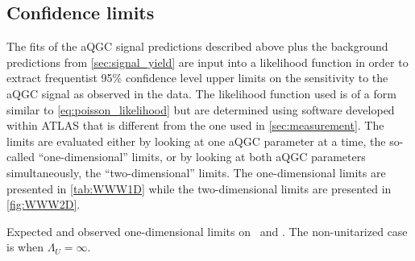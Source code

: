 \subsection{Confidence limits}

The fits of the aQGC signal predictions described above plus the background predictions
from \sec\ref{sec:signal_yield} are input into a likelihood function
in order to extract frequentist 95\% confidence level upper limits on the 
sensitivity to the aQGC signal as observed in the data.
The likelihood function used is of a form similar to \eqn\eqref{eq:poisson_likelihood}
but are determined using software developed within ATLAS \cite{tgclim} that is different
from the one used in \sec\ref{sec:measurement}.
The limits are evaluated either by looking at one aQGC 
parameter at a time, the so-called ``one-dimensional''
limits, or by looking at both aQGC parameters simultaneously, the 
``two-dimensional'' limits. The one-dimensional limits
are presented in \tab\ref{tab:WWW1D}
while the two-dimensional limits are presented in 
\fig\ref{fig:WWW2D}.
  
 
 \begin{table}
   \begin{center}
   
     \caption{Expected and observed one-dimensional limits on \fszero~and \fsone.
     The non-unitarized case is when $\Lambda_U=\infty$.}
     \label{tab:WWW1D}

   \end{center}
 \end{table}
 
